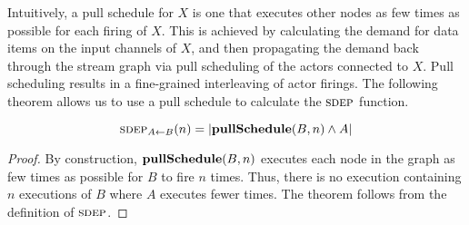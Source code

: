 Intuitively, a pull schedule for $X$ is one that executes other nodes
as few times as possible for each firing of $X$.  This is achieved by
calculating the demand for data items on the input channels of $X$,
and then propagating the demand back through the stream graph via pull
scheduling of the actors connected to $X$.  Pull scheduling results in
a fine-grained interleaving of actor firings.  The following theorem
allows us to use a pull schedule to calculate the $\textsc{sdep}$ function.
\begin{theorem} 
\[
\sdepf{A}{B}(n) = |{\bf pullSchedule}(B, n) \wedge A|
\]
\end{theorem}
\begin{proof}
By construction, ${\bf pullSchedule}(B, n)$ executes each node in the
graph as few times as possible for $B$ to fire $n$ times.  Thus, there
is no execution containing $n$ executions of $B$ where $A$ executes
fewer times.  The theorem follows from the definition of $\textsc{sdep}$.
\end{proof}

